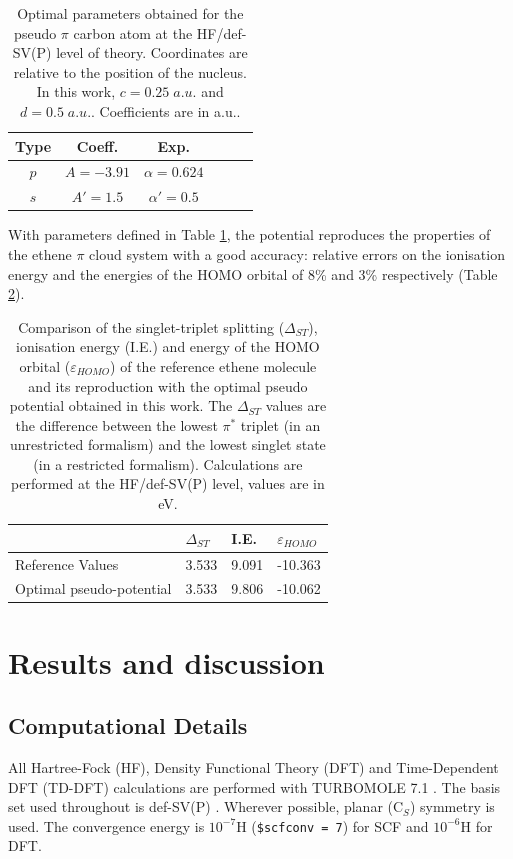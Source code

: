 \documentclass[aip]{revtex4-1}
\begin{document}
\begin{table}[ht]
\caption{\label{tab:params}Optimal parameters obtained for the pseudo 
$\pi$ carbon atom at the HF/def-SV(P) level of theory.
Coordinates are relative to the position of the nucleus.
In this work, $c=0.25\;a.u.$ and $d=0.5\;a.u.$.
Coefficients are in a.u..
}
\begin{tabular}{ccccrr}
\hline\hline
Type &  Coeff. & Exp. \\
\hline
$p$  & $A=-3.91$ & $\alpha=0.624$ \\
$s$  & $A'=1.5$   & $\alpha'=0.5$   \\
\hline\hline
\end{tabular}
\end{table}

With parameters defined in Table \ref{tab:params}, the potential reproduces the properties
of the ethene $\pi$ cloud system with a good accuracy: relative errors on the ionisation
energy and the energies of the HOMO orbital of 8\% and 3\% respectively (Table \ref{tab:res_ourPP}).

\begin{table}[ht]
\caption{\label{tab:res_ourPP}Comparison of the
singlet-triplet splitting ($\Delta_{ST}$), ionisation
energy (I.E.) and energy of the HOMO orbital ($\varepsilon_{HOMO}$)
of the reference ethene molecule
and its reproduction with the optimal pseudo potential obtained in this work.
The $\Delta_{ST}$ values are the difference
between the lowest $\pi^*$ triplet (in an unrestricted formalism) and the lowest singlet state
(in a restricted formalism).
Calculations are performed at the HF/def-SV(P) level, values are in eV.}
\begin{tabular}{llll}
\hline\hline
& $\Delta_{ST}$  & I.E.  & $\varepsilon_{HOMO}$  \\
\hline
Reference Values & 3.533 & 9.091 & -10.363 \\
Optimal pseudo-potential & 3.533 & 9.806 & -10.062 \\
\hline\hline
\end{tabular}
\end{table}

\section{Results and discussion}

\subsection{Computational Details}
All Hartree-Fock (HF), Density Functional Theory (DFT) and Time-Dependent DFT (TD-DFT) calculations
are performed with TURBOMOLE 7.1 \cite{TURBOMOLE}.
The basis set used throughout is def-SV(P) \cite{defsvp}.
Wherever possible, planar (C\(_{S}\)) symmetry is used.
The convergence energy is \(10^{-7}\)H (\texttt{\$scfconv = 7}) for SCF and \(10^{-6}\)H for DFT.
\end{document}

